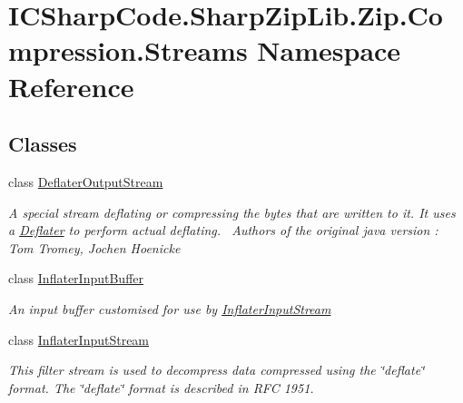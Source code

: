 \hypertarget{namespace_i_c_sharp_code_1_1_sharp_zip_lib_1_1_zip_1_1_compression_1_1_streams}{}\section{I\+C\+Sharp\+Code.\+Sharp\+Zip\+Lib.\+Zip.\+Compression.\+Streams Namespace Reference}
\label{namespace_i_c_sharp_code_1_1_sharp_zip_lib_1_1_zip_1_1_compression_1_1_streams}
\subsection*{Classes}
\begin{DoxyCompactItemize}
\item 
class \hyperlink{class_i_c_sharp_code_1_1_sharp_zip_lib_1_1_zip_1_1_compression_1_1_streams_1_1_deflater_output_stream}{Deflater\+Output\+Stream}
\begin{DoxyCompactList}\small\item\em A special stream deflating or compressing the bytes that are written to it. It uses a \hyperlink{class_i_c_sharp_code_1_1_sharp_zip_lib_1_1_zip_1_1_compression_1_1_deflater}{Deflater} to perform actual deflating.~\newline
 Authors of the original java version \+: Tom Tromey, Jochen Hoenicke \end{DoxyCompactList}\item 
class \hyperlink{class_i_c_sharp_code_1_1_sharp_zip_lib_1_1_zip_1_1_compression_1_1_streams_1_1_inflater_input_buffer}{Inflater\+Input\+Buffer}
\begin{DoxyCompactList}\small\item\em An input buffer customised for use by \hyperlink{class_i_c_sharp_code_1_1_sharp_zip_lib_1_1_zip_1_1_compression_1_1_streams_1_1_inflater_input_stream}{Inflater\+Input\+Stream} \end{DoxyCompactList}\item 
class \hyperlink{class_i_c_sharp_code_1_1_sharp_zip_lib_1_1_zip_1_1_compression_1_1_streams_1_1_inflater_input_stream}{Inflater\+Input\+Stream}
\begin{DoxyCompactList}\small\item\em This filter stream is used to decompress data compressed using the \char`\"{}deflate\char`\"{} format. The \char`\"{}deflate\char`\"{} format is described in R\+FC 1951. \end{DoxyCompactList}\item 

\end{DoxyCompactItemize}
